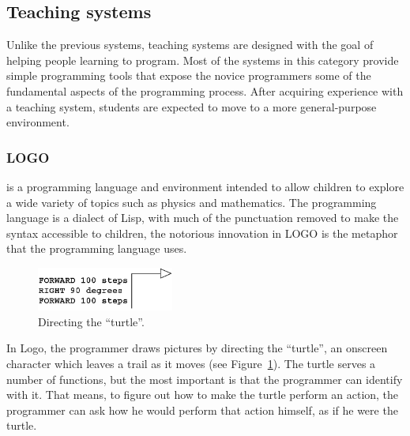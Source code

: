 \subsection{Teaching systems}
\label{sec:ts}

Unlike the previous systems, teaching systems are designed with the goal of helping people learning to program. Most of the systems in this category provide simple programming tools that expose the novice programmers some of the fundamental aspects of the programming process. After acquiring experience with a teaching system, students are expected to move to a more general-purpose environment. 

\subsubsection{LOGO~\cite{papert1980mindstorms}} is a programming language and environment intended to allow children to explore a wide variety of topics such as physics and mathematics. The programming language is a dialect of Lisp, with much of the punctuation removed to make the syntax accessible to children, the notorious innovation in LOGO is the metaphor that the programming language uses.

\begin{figure}
  \vspace{-25pt}
  \begin{center}
    \includegraphics[width=0.4\textwidth]{img/turtle}
  \end{center}
  \vspace{-15pt}
 \caption{Directing the ``turtle''.}  
  \vspace{-20pt}
    \label{fig:turtle}
\end{figure}

In Logo, the programmer draws pictures by directing the ``turtle'', an onscreen character which leaves a trail as it moves (see Figure~\ref{fig:turtle}). The turtle serves a number of functions, but the most important is that the programmer can identify with it. That means, to figure out how to make the turtle perform an action, the programmer can ask how he would perform that action himself, as if he were the turtle.

